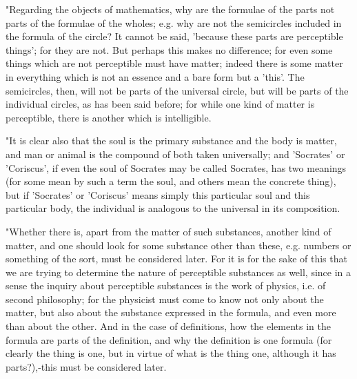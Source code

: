 "Regarding the objects of mathematics, why are the formulae of the
parts not parts of the formulae of the wholes; e.g. why are not the
semicircles included in the formula of the circle? It cannot be said,
'because these parts are perceptible things'; for they are not. But
perhaps this makes no difference; for even some things which are not
perceptible must have matter; indeed there is some matter in everything
which is not an essence and a bare form but a 'this'. The semicircles,
then, will not be parts of the universal circle, but will be parts
of the individual circles, as has been said before; for while one
kind of matter is perceptible, there is another which is intelligible.

"It is clear also that the soul is the primary substance and the body
is matter, and man or animal is the compound of both taken universally;
and 'Socrates' or 'Coriscus', if even the soul of Socrates may be
called Socrates, has two meanings (for some mean by such a term the
soul, and others mean the concrete thing), but if 'Socrates' or 'Coriscus'
means simply this particular soul and this particular body, the individual
is analogous to the universal in its composition. 

"Whether there is, apart from the matter of such substances, another
kind of matter, and one should look for some substance other than
these, e.g. numbers or something of the sort, must be considered later.
For it is for the sake of this that we are trying to determine the
nature of perceptible substances as well, since in a sense the inquiry
about perceptible substances is the work of physics, i.e. of second
philosophy; for the physicist must come to know not only about the
matter, but also about the substance expressed in the formula, and
even more than about the other. And in the case of definitions, how
the elements in the formula are parts of the definition, and why the
definition is one formula (for clearly the thing is one, but in virtue
of what is the thing one, although it has parts?),-this must be considered
later. 

